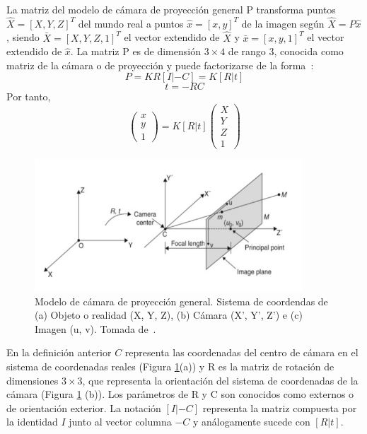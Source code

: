 \begin{definition}
	La matriz del modelo de cámara de proyección general P transforma puntos $\hat{X} = [X, Y, Z]^T$ del mundo real a puntos $\hat{x} = [x, y]^T$ de la imagen según $\hat{X} = P\hat{x}$, siendo $\bar{X} = [X, Y, Z, 1]^T$ el vector extendido de $\hat{X}$ y $\bar{x} = [x, y, 1]^T$ el vector extendido de $\hat{x}$. La matriz P es de dimensión $3 \times 4$ de rango 3, conocida como matriz de la cámara o de proyección y puede factorizarse de la forma~\cite{hartley2004camera}:
	\begin{equation}\label{eq:proyGeneral-1}
		P = KR[I| - C] = K[R|t]
	\end{equation}
	\begin{equation}\label{eq:proyGeneral-2}
		t = -RC
	\end{equation}
	Por tanto,
	\begin{equation}\label{eq:proyGeneral-3}
		\begin{pmatrix}
			x\\
			y\\
			1
		\end{pmatrix} = K[R|t] \begin{pmatrix}
			X\\
			Y\\
			Z\\
			1	
		\end{pmatrix}
	\end{equation}
\end{definition}

\begin{figure}[ht]
	\centering
	\includegraphics[width=10cm]{./Graphics/modelo-proyeccion-general.png}
	\caption{Modelo de cámara de proyección general. Sistema de coordendas de (a) Objeto o realidad (X, Y, Z), (b) Cámara (X', Y', Z') e (c) Imagen (u, v). Tomada de~\cite{ji2022vision}.}
	\label{fig:proyGeneral}
\end{figure}

En la definición anterior $C$ representa las coordenadas del centro de cámara en el sistema de coordenadas reales (Figura \ref{fig:proyGeneral}(a)) y R es la matriz de rotación de dimensiones $3 \times 3$, que representa la orientación del sistema de coordenadas de la cámara (Figura \ref{fig:proyGeneral} (b)). Los parámetros de R y C son conocidos como externos o de orientación exterior. La notación $[I| - C]$ representa la matriz compuesta por la identidad $I$ junto al vector columna $-C$ y análogamente sucede con $[R|t]$.

